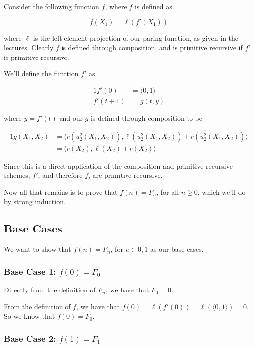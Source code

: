 \documentclass{article}
\begin{document}
Consider the following function $f$, where $f$ is defined as

$$f(X_1) = \ell(f'(X_1))$$

where $\ell$ is the left element projection of our paring function, as
given in the lectures. Clearly $f$ is defined through composition, and
is primitive recursive if $f'$ is primitive recursive.

We'll define the function $f'$ as

\begin{alignat*}{1}
  f'(0) &= \langle 0, 1 \rangle \\ f'(t+1) &= g(t, y)
\end{alignat*}

where $y = f'(t)$ and our $g$ is defined through composition to be

\begin{alignat*}{1}
  g(X_1, X_2) &= \langle r(u^2_2(X_1, X_2)), \ell(u^2_2(X_1, X_2)) +
  r(u^2_2(X_1, X_2)) \rangle \\ &= \langle r(X_2), \ell(X_2) + r(X_2)
  \rangle
\end{alignat*}

Since this is a direct application of the composition and primitive
recursive schemes, $f'$, and therefore $f$, are primitive recursive.


Now all that remains is to prove that $f(n) = F_n$, for all $n \ge 0$,
which we'll do by strong induction.

\subsection*{Base Cases}

We want to show that $f(n) = F_n$, for $n \in {0, 1}$ as our base cases.

\subsubsection*{Base Case 1: $f(0) = F_0$}

Directly from the definition of $F_n$, we have that $F_0 = 0$.  

From the definition of $f$, we have that
$f(0) = \ell(f'(0)) = \ell(\langle 0, 1\rangle) = 0$. So we know that
$f(0) = F_0$.

\subsubsection*{Base Case 2: $f(1) = F_1$}
\end{document}
